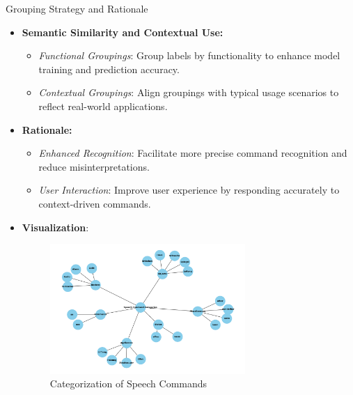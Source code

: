 \documentclass{beamer}
\begin{document}
\begin{frame}{Grouping Strategy and Rationale}
  \begin{itemize}
    \item \textbf{Semantic Similarity and Contextual Use:}
      \begin{itemize}
        \item \textit{Functional Groupings}: Group labels by functionality to enhance model training and prediction accuracy.
        \item \textit{Contextual Groupings}: Align groupings with typical usage scenarios to reflect real-world applications.
      \end{itemize}
    \item \textbf{Rationale:}
      \begin{itemize}
        \item \textit{Enhanced Recognition}: Facilitate more precise command recognition and reduce misinterpretations.
        \item \textit{User Interaction}: Improve user experience by responding accurately to context-driven commands.
      \end{itemize}
    \item \textbf{Visualization}:
      \begin{figure}
        \centering
        \includegraphics[width=0.7\textwidth]{fig/mindmap_command_grouping} %
        \caption{Categorization of Speech Commands}
        \label{fig:grouping}
      \end{figure}
  \end{itemize}
\end{frame}
\end{document}
